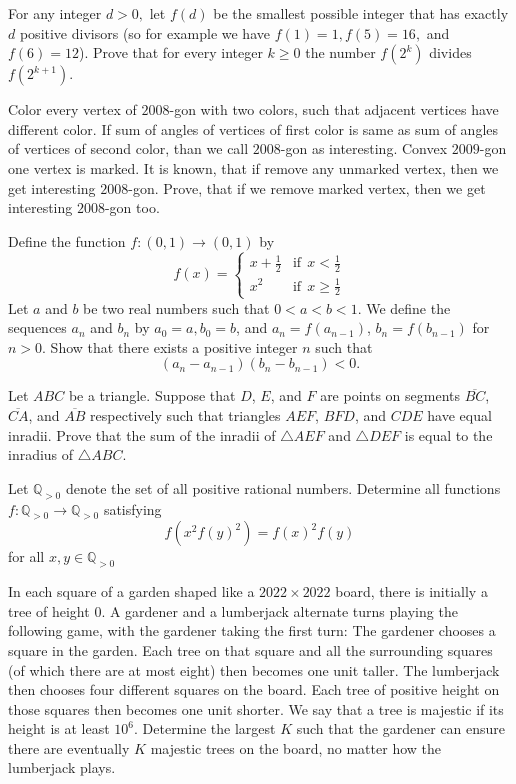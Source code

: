 \documentclass[11pt]{scrartcl}
\begin{document}
\begin{problem}[8752098831819609857]
For any integer $d > 0,$ let $f(d)$ be the smallest possible integer that has exactly $d$ positive divisors (so for example we have $f(1)=1, f(5)=16,$ and $f(6)=12$). Prove that for every integer $k \geq 0$ the number $f\left(2^k\right)$ divides $f\left(2^{k+1}\right).$
\end{problem}
\begin{problem}[8757490679465390171]
	Color every vertex of $2008$-gon with two colors, such that adjacent vertices have different color. If sum of angles of vertices of first color is same as sum of angles of vertices of second color, than we call $2008$-gon as interesting.
Convex $2009$-gon one vertex is marked. It is known, that if remove any unmarked vertex, then we get interesting $2008$-gon. Prove, that if we remove marked vertex, then we get interesting $2008$-gon too.
\end{problem}
\begin{problem}[8765929309402693604]
	Define the function $f:(0,1)\to (0,1)$ by\[\displaystyle f(x) = \left\{ \begin{array}{lr} x+\frac 12 & \text{if}\ \  x < \frac 12\\ x^2 & \text{if}\ \  x \ge \frac 12 \end{array} \right.\]Let $a$ and $b$ be two real numbers such that $0 < a < b < 1$. We define the sequences $a_n$ and $b_n$ by $a_0 = a, b_0 = b$, and $a_n = f( a_{n -1})$, $b_n = f (b_{n -1} )$ for $n > 0$. Show that there exists a positive integer $n$ such that\[(a_n - a_{n-1})(b_n-b_{n-1})<0.\]
\end{problem}
\begin{problem}[8778540732652162753]
Let $ABC$ be a triangle. Suppose that $D$, $E$, and $F$ are points on segments $\overline{BC}$, $\overline{CA}$, and $\overline{AB}$ respectively such that triangles $AEF$, $BFD$, and $CDE$ have equal inradii. Prove that the sum of the inradii of $\triangle AEF$ and $\triangle DEF$ is equal to the inradius of $\triangle ABC$.
\end{problem}
\begin{problem}[8782897210450267045]
Let $\mathbb{Q}_{>0}$ denote the set of all positive rational numbers. Determine all functions $f:\mathbb{Q}_{>0}\to \mathbb{Q}_{>0}$ satisfying$$f(x^2f(y)^2)=f(x)^2f(y)$$for all $x,y\in\mathbb{Q}_{>0}$
\end{problem}
\begin{problem}[8799177804774743019]
In each square of a garden shaped like a $2022 \times 2022$ board, there is initially a tree of height $0$. A gardener and a lumberjack alternate turns playing the following game, with the gardener taking the first turn:
The gardener chooses a square in the garden. Each tree on that square and all the surrounding squares (of which there are at most eight) then becomes one unit taller.
The lumberjack then chooses four different squares on the board. Each tree of positive height on those squares then becomes one unit shorter.
We say that a tree is majestic if its height is at least $10^6$. Determine the largest $K$ such that the gardener can ensure there are eventually $K$ majestic trees on the board, no matter how the lumberjack plays.
\end{problem}
\end{document}
